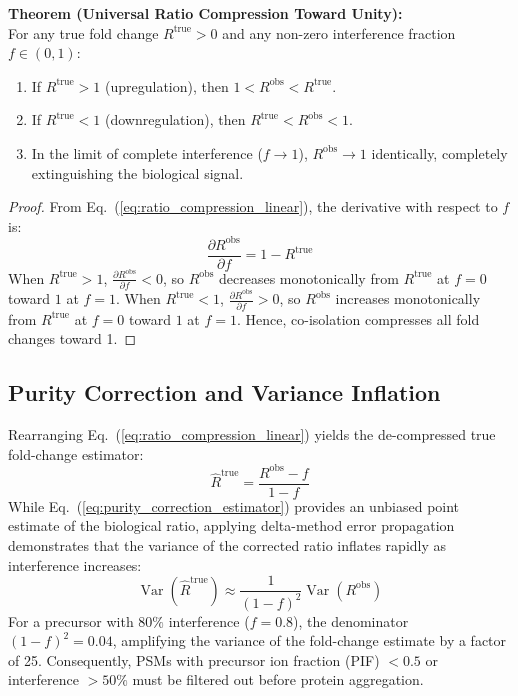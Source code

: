 \documentclass[11pt,oneside]{book}
\begin{document}
\begin{deepdive}
\textbf{Theorem (Universal Ratio Compression Toward Unity):}\\
For any true fold change $R^{\text{true}} > 0$ and any non-zero interference fraction $f \in (0, 1)$:
\begin{enumerate}
    \item If $R^{\text{true}} > 1$ (upregulation), then $1 < R^{\text{obs}} < R^{\text{true}}$.
    \item If $R^{\text{true}} < 1$ (downregulation), then $R^{\text{true}} < R^{\text{obs}} < 1$.
    \item In the limit of complete interference ($f \to 1$), $R^{\text{obs}} \to 1$ identically, completely extinguishing the biological signal.
\end{enumerate}
\begin{proof}
From Eq.~(\ref{eq:ratio_compression_linear}), the derivative with respect to $f$ is:
$$\frac{\partial R^{\text{obs}}}{\partial f} = 1 - R^{\text{true}}$$
When $R^{\text{true}} > 1$, $\frac{\partial R^{\text{obs}}}{\partial f} < 0$, so $R^{\text{obs}}$ decreases monotonically from $R^{\text{true}}$ at $f = 0$ toward $1$ at $f = 1$. When $R^{\text{true}} < 1$, $\frac{\partial R^{\text{obs}}}{\partial f} > 0$, so $R^{\text{obs}}$ increases monotonically from $R^{\text{true}}$ at $f = 0$ toward $1$ at $f = 1$. Hence, co-isolation compresses all fold changes toward 1.
\end{proof}
\end{deepdive}

\subsection{Purity Correction and Variance Inflation}
Rearranging Eq.~(\ref{eq:ratio_compression_linear}) yields the de-compressed true fold-change estimator:
\begin{equation}
\hat{R}^{\text{true}} = \frac{R^{\text{obs}} - f}{1 - f}
\label{eq:purity_correction_estimator}
\end{equation}
While Eq.~(\ref{eq:purity_correction_estimator}) provides an unbiased point estimate of the biological ratio, applying delta-method error propagation demonstrates that the variance of the corrected ratio inflates rapidly as interference increases:
\begin{equation}
\operatorname{Var}\left( \hat{R}^{\text{true}} \right) \approx \frac{1}{(1 - f)^2} \operatorname{Var}\left( R^{\text{obs}} \right)
\label{eq:variance_inflation}
\end{equation}
For a precursor with $80\%$ interference ($f = 0.8$), the denominator $(1 - f)^2 = 0.04$, amplifying the variance of the fold-change estimate by a factor of 25. Consequently, PSMs with precursor ion fraction (PIF) $< 0.5$ or interference $> 50\%$ must be filtered out before protein aggregation.
\end{document}
